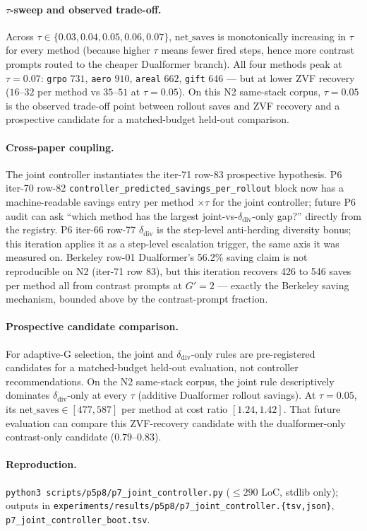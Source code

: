 \paragraph{$\tau$-sweep and observed trade-off.}
Across $\tau \in \{0.03, 0.04, 0.05, 0.06, 0.07\}$, $\mathrm{net\_saves}$
is monotonically increasing in $\tau$ for every method (because higher
$\tau$ means fewer fired steps, hence more contrast prompts routed to
the cheaper Dualformer branch). All four methods peak at
$\tau{=}0.07$: \texttt{grpo} $731$, \texttt{aero} $910$,
\texttt{areal} $662$, \texttt{gift} $646$ --- but at lower ZVF recovery
($16$--$32$ per method vs $35$--$51$ at $\tau{=}0.05$). On this N2
same-stack corpus, $\tau{=}0.05$ is the observed trade-off point between
rollout saves and ZVF recovery and a prospective candidate for a
matched-budget held-out comparison.

\paragraph{Cross-paper coupling.}
The joint controller instantiates the iter-71 row-83 prospective
hypothesis. P6 iter-70 row-82
\texttt{controller\_predicted\_savings\_per\_rollout} block now has a
machine-readable savings entry per method $\times \tau$ for the joint
controller; future P6 audit can ask ``which method has the largest
joint-vs-$\delta_{\mathrm{div}}$-only gap?'' directly from the
registry. P6 iter-66 row-77 $\delta_{\mathrm{div}}$ is the step-level
anti-herding diversity bonus; this iteration applies it as a step-level
escalation trigger, the same axis it was measured on. Berkeley row-01
Dualformer's 56.2\% saving claim is not reproducible on N2 (iter-71
row 83), but this iteration recovers 426 to 546 saves per method all from
contrast prompts at $G'{=}2$ --- exactly the Berkeley saving mechanism,
bounded above by the contrast-prompt fraction.

\paragraph{Prospective candidate comparison.}
For adaptive-G selection, the joint and $\delta_{\mathrm{div}}$-only rules
are pre-registered candidates for a matched-budget held-out evaluation, not
controller recommendations. On the N2 same-stack corpus, the joint rule
descriptively dominates $\delta_{\mathrm{div}}$-only at every $\tau$
(additive Dualformer rollout savings). At $\tau{=}0.05$, its
$\mathrm{net\_saves} \in [477,587]$ per method at cost ratio $[1.24,1.42]$.
That future evaluation can compare this ZVF-recovery candidate with the
dualformer-only contrast-only candidate ($0.79$--$0.83$).

\paragraph{Reproduction.}
\texttt{python3 scripts/p5p8/p7\_joint\_controller.py}
($\leq 290$ LoC, stdlib only); outputs in
\texttt{experiments/results/p5p8/p7\_joint\_controller.\{tsv,json\}},
\texttt{p7\_joint\_controller\_boot.tsv}.
\fi
